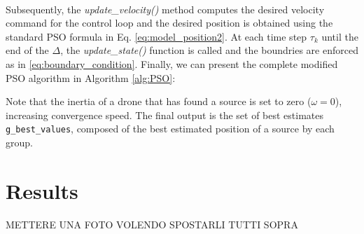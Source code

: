 \noindent\\
Subsequently, the \textit{update\_velocity()} method computes the desired 
velocity command for the control loop and the desired position is obtained 
using the standard PSO formula in Eq. \ref{eq:model_position2}.
At each time step $\tau_k$ until the end of the $\Delta$, 
the \textit{update\_state()} function is called and the
boundries are enforced as in \ref{eq:boundary_condition}.
Finally, we can present the complete modified PSO algorithm in 
Algorithm \ref{alg:PSO}: 

Note that the inertia of a drone that has found a source 
is set to zero (\(\omega = 0\)), increasing
convergence speed. The final output is the set of best estimates 
\texttt{g\_best\_values}, composed of the best estimated position 
of a source by each group.

\newpage
\section{Results}
METTERE UNA FOTO VOLENDO
SPOSTARLI TUTTI SOPRA

